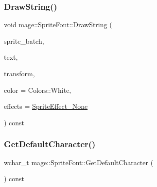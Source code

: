 \hypertarget{classmage_1_1_sprite_font_aafbc3398a564f7f521af0be2b4deedc1}{}\label{classmage_1_1_sprite_font_aafbc3398a564f7f521af0be2b4deedc1} 
\subsubsection{\texorpdfstring{Draw\+String()}{DrawString()}}
{\footnotesize\ttfamily void mage\+::\+Sprite\+Font\+::\+Draw\+String (\begin{DoxyParamCaption}\item[{Sprite\+Batch \&}]{sprite\+\_\+batch,  }\item[{const wchar\+\_\+t $\ast$}]{text,  }\item[{const Sprite\+Transform \&}]{transform,  }\item[{const X\+M\+V\+E\+C\+T\+OR \&}]{color = {\ttfamily Colors\+:\+:White},  }\item[{\hyperlink{namespacemage_a9cfe18123066ba4236f548f9de75d881}{Sprite\+Effect}}]{effects = {\ttfamily \hyperlink{namespacemage_a9cfe18123066ba4236f548f9de75d881af3c275fbfacfe174da928b2f24dfa515}{Sprite\+Effect\+\_\+\+None}} }\end{DoxyParamCaption}) const}

\hypertarget{classmage_1_1_sprite_font_a06c0cfea70ad01946447e7eed901dc57}{}\label{classmage_1_1_sprite_font_a06c0cfea70ad01946447e7eed901dc57} 
\subsubsection{\texorpdfstring{Get\+Default\+Character()}{GetDefaultCharacter()}}
{\footnotesize\ttfamily wchar\+\_\+t mage\+::\+Sprite\+Font\+::\+Get\+Default\+Character (\begin{DoxyParamCaption}{ }\end{DoxyParamCaption}) const}

\hypertarget{classmage_1_1_sprite_font_aa13424a1e0153ffb9433bb2cb416360b}{}\label{classmage_1_1_sprite_font_aa13424a1e0153ffb9433bb2cb416360b} 
